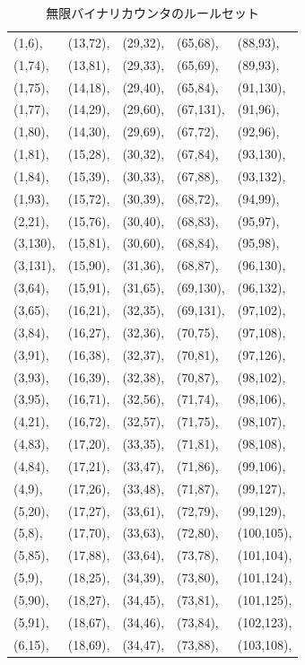 \documentclass[a4,11pt]{article}
\begin{document}
\begin{center}
\begin{longtable}[p]{l l l l l}
\caption{無限バイナリカウンタのルールセット}
\label{table:rule}
\endfirsthead \endhead \endfoot \endlastfoot 
(1,6),&(13,72),&(29,32), &(65,68),&(88,93),\\
(1,74),&(13,81),&(29,33),&(65,69),&(89,93),\\
(1,75),&(14,18),&(29,40),&(65,84),&(91,130),\\
(1,77),&(14,29),&(29,60),&(67,131),&(91,96),\\
(1,80),&(14,30),&(29,69),&(67,72),&(92,96),\\
(1,81),&(15,28),&(30,32),&(67,84),&(93,130),\\
(1,84),&(15,39),&(30,33),&(67,88),&(93,132),\\
(1,93),&(15,72),&(30,39),&(68,72),&(94,99),\\
(2,21),&(15,76),&(30,40),&(68,83),&(95,97),\\
(3,130),&(15,81),&(30,60),&(68,84),&(95,98),\\
(3,131),&(15,90),&(31,36),&(68,87),&(96,130),\\
(3,64),&(15,91),&(31,65),&(69,130),&(96,132),\\
(3,65),&(16,21),&(32,35),&(69,131),&(97,102),\\
(3,84),&(16,27),&(32,36),&(70,75),&(97,108),\\
(3,91),&(16,38),&(32,37),&(70,81),&(97,126),\\
(3,93),&(16,39),&(32,38),&(70,87),&(98,102),\\
(3,95),&(16,71),&(32,56),&(71,74),&(98,106),\\
(4,21),&(16,72),&(32,57),&(71,75),&(98,107),\\
(4,83),&(17,20),&(33,35),&(71,81),&(98,108),\\
(4,84),&(17,21),&(33,47),&(71,86),&(99,106),\\
(4,9),&(17,26),&(33,48),&(71,87),&(99,127),\\
(5,20),&(17,27),&(33,61),&(72,79),&(99,129),\\
(5,8),&(17,70),&(33,63),&(72,80),&(100,105),\\
(5,85),&(17,88),&(33,64),&(73,78),&(101,104),\\
(5,9),&(18,25),&(34,39),&(73,80),&(101,124),\\
(5,90),&(18,27),&(34,45),&(73,81),&(101,125),\\
(5,91),&(18,67),&(34,46),&(73,84),&(102,123),\\
(6,15),&(18,69),&(34,47),&(73,88),&(103,108),\\

\end{longtable}
\end{center}
\end{document}
